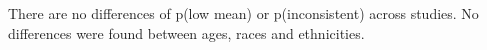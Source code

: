 \documentclass[12pt]{article}
\begin{document}
	 There are no differences of p(low mean) or p(inconsistent) across studies. No differences were found between ages, races and ethnicities.
	
	
	
	
	
	
\end{document}
